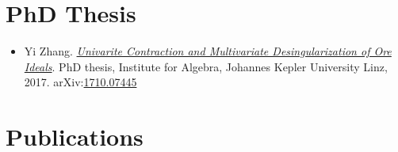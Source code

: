 \documentclass[a4paper,12pt]{article}
\begin{document}

\section*{\Large{PhD Thesis}}
\begin{itemize}
 \item Yi Zhang. \href{https://yzhang1616.github.io/yzhang_PhDthesis_final.pdf}{{\em Univarite 
                Contraction and Multivariate Desingularization of Ore Ideals}}. 
                PhD thesis, Institute for Algebra, Johannes Kepler University Linz, 2017. 
                arXiv:\href{https://arxiv.org/abs/1710.07445}{1710.07445}
\end{itemize}


\section*{\Large{Publications}}
\end{document}
